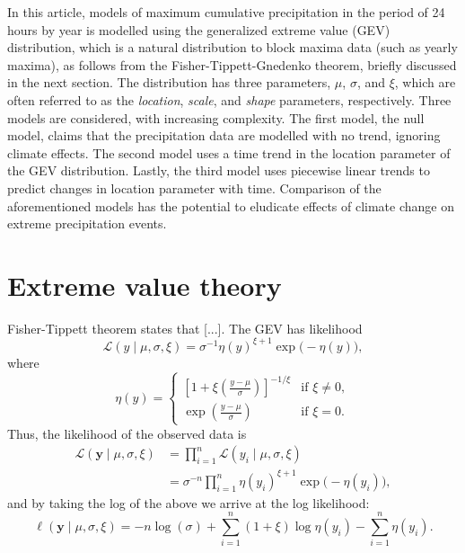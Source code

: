 \documentclass[12pt, a4paper]{article}
\begin{document}
  In this article, models of maximum cumulative precipitation in the period of
  24 hours by year is modelled using the generalized extreme value (GEV)
  distribution, which is a natural distribution to block maxima data (such as
  yearly maxima), as follows from the Fisher-Tippett-Gnedenko theorem, briefly
  discussed in the next section. The distribution has three parameters,
  \(\mu\), \(\sigma\), and \(\xi\), which are often referred to as the 
  \textit{location}, \textit{scale}, and \textit{shape} parameters,
  respectively. Three models are considered, with increasing complexity. The
  first model, the null model, claims that the precipitation data are
  modelled with no trend, ignoring climate effects. The second model uses a
  time trend in the location parameter of the GEV distribution. Lastly, the 
  third model uses piecewise linear trends to predict changes in location
  parameter with time. Comparison of the aforementioned models has the
  potential to eludicate effects of climate change on extreme precipitation
  events.

  \section{Extreme value theory}
  Fisher-Tippett theorem states that [...]. The GEV has likelihood
  \[
    \mathcal L(y \mid \mu, \sigma, \xi) = \sigma^{-1} \eta(y)^{\xi + 1}
                                          \exp\big(-\eta(y)\big),
  \]
  where
  \[
    \eta(y) = \begin{cases}
      \left[1 + \xi \left(\frac{y - \mu}{\sigma}\right)\right]^{-1/\xi}
      &\text{if } \xi \neq 0, \\
      \exp\left(\frac{y - \mu}{\sigma}\right) &\text{if } \xi = 0.
    \end{cases}
  \]
  Thus, the likelihood of the observed data is 
  \begin{align*}
    \mathcal L(\bm y \mid \mu, \sigma, \xi)
    &= \prod_{i = 1}^n \mathcal L(y_i \mid \mu, \sigma, \xi) \\
    &= \sigma^{-n} \prod_{i = 1}^n \eta(y_i)^{\xi + 1} \exp\big(
       -\eta(y_i)\big),
  \end{align*}
  and by taking the log of the above we arrive at the log likelihood:
  \[
    \ell(\bm y \mid \mu, \sigma, \xi)
    = -n \log(\sigma) + \sum_{i = 1}^n (1 + \xi) \log \eta(y_i)
                      - \sum_{i = 1}^n \eta(y_i).
  \]


  
\end{document}

